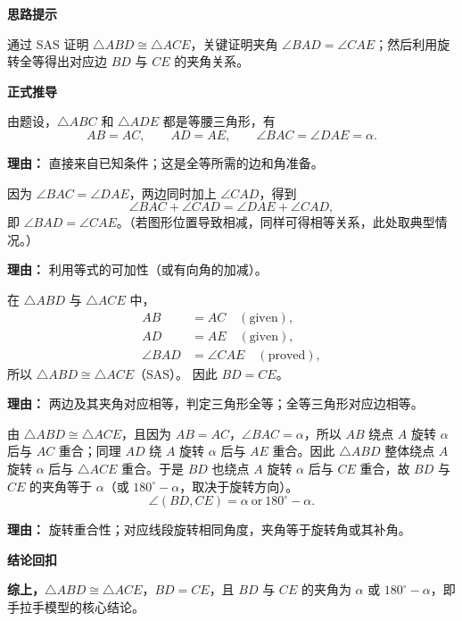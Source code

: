 \begin{proofbox}

	\textbf{\textcolor{CProof}{思路提示}}

	通过 SAS 证明 $\triangle ABD\cong\triangle ACE$，关键证明夹角 $\angle BAD = \angle CAE$；然后利用旋转全等得出对应边 $BD$ 与 $CE$ 的夹角关系。

	\medskip
	\textbf{\textcolor{CProof}{正式推导}}
	\begin{description}[style=nextline, leftmargin=2.8em, labelsep=0.5em, itemsep=0.55em]
		\item[\textbf{步骤一（等腰条件）：}]
			由题设，$\triangle ABC$ 和 $\triangle ADE$ 都是等腰三角形，有
			\[
				AB = AC,
				\qquad
				AD = AE,
				\qquad
				\angle BAC = \angle DAE = \alpha .
			\]
			\par\textbf{理由：}
			直接来自已知条件；这是全等所需的边和角准备。

		\item[\textbf{步骤二（夹角相等）：}]
			因为 $\angle BAC = \angle DAE$，两边同时加上 $\angle CAD$，得到
			\[
				\angle BAC + \angle CAD = \angle DAE + \angle CAD,
			\]
			即 $\angle BAD = \angle CAE$。（若图形位置导致相减，同样可得相等关系，此处取典型情况。）
			\par\textbf{理由：}
			利用等式的可加性（或有向角的加减）。

		\item[\textbf{步骤三（全等判定）：}]
			在 $\triangle ABD$ 与 $\triangle ACE$ 中，
			\[
				\begin{aligned}
					AB &= AC \quad (\text{given}),\\
					AD &= AE \quad (\text{given}),\\
					\angle BAD &= \angle CAE \quad (\text{proved}),
			\end{aligned}
			\]
			所以 $\triangle ABD \cong \triangle ACE$（SAS）。
			因此 $BD = CE$。
			\par\textbf{理由：}
			两边及其夹角对应相等，判定三角形全等；全等三角形对应边相等。

		\item[\textbf{步骤四（夹角关系）：}]
			由 $\triangle ABD \cong \triangle ACE$，且因为 $AB = AC$，$\angle BAC = \alpha$，所以 $AB$ 绕点 $A$ 旋转 $\alpha$ 后与 $AC$ 重合；同理 $AD$ 绕 $A$ 旋转 $\alpha$ 后与 $AE$ 重合。因此 $\triangle ABD$ 整体绕点 $A$ 旋转 $\alpha$ 后与 $\triangle ACE$ 重合。于是 $BD$ 也绕点 $A$ 旋转 $\alpha$ 后与 $CE$ 重合，故 $BD$ 与 $CE$ 的夹角等于 $\alpha$（或 $180^\circ - \alpha$，取决于旋转方向）。
			\[
				\angle(BD, CE) = \alpha \ \text{or} \ 180^\circ - \alpha .
			\]
			\par\textbf{理由：}
			旋转重合性；对应线段旋转相同角度，夹角等于旋转角或其补角。
	\end{description}

	\medskip
	\textbf{\textcolor{CProof}{结论回扣}}

	\textbf{综上，}$\triangle ABD \cong \triangle ACE$，$BD = CE$，且 $BD$ 与 $CE$ 的夹角为 $\alpha$ 或 $180^\circ-\alpha$，即手拉手模型的核心结论。

\end{proofbox}
